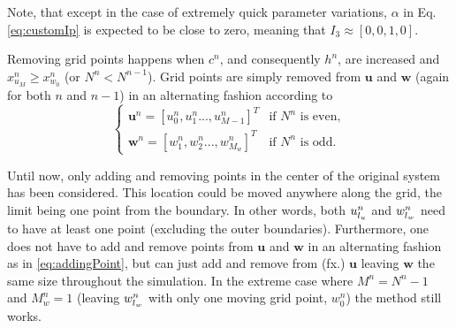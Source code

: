 \noindent Note, that except in the case of extremely quick parameter variations, $\alpha$ in Eq. \eqref{eq:customIp} is expected to be close to zero, %
meaning that $I_3 \approx [0, 0, 1, 0]$. %

Removing grid points happens when $c^n$, and consequently $h^n$, are increased and $x_{u_M}^n \geq x_{w_0}^n$ (or $ N^n <  N^{n-1}$). %
Grid points are simply removed from $\mathbf{u}$ and $\mathbf{w}$ (again for both $n$ and $n-1$) in an alternating fashion according to
\begin{equation}\label{eq:removingPoint}
\begin{cases}
    \mathbf{u}^n = [u_0^n, u_1^n ..., u_{M-1}^n]^T & \text{if $N^n$ is even}, \\
     \mathbf{w}^n = [w_1^n, w_2^n ..., w_{M_w}^n]^T & \text{if $N^n$ is odd}.
    \end{cases}
\end{equation}

Until now, only adding and removing points in the center of the original system has been considered. This location could be moved anywhere along the grid, the limit being one point from the boundary. In other words, both $u_{l_u}^n$ and $w_{l_w}^n$ need to have at least one point (excluding the outer boundaries). Furthermore, one does not have to add and remove points from $\mathbf{u}$ and $\mathbf{w}$ in an alternating fashion as in \eqref{eq:addingPoint}, but can just add and remove from (fx.) $\mathbf{u}$ leaving $\mathbf{w}$ the same size throughout the simulation. In the extreme case where $M^n = N^n - 1$ and $M_w^n = 1$ (leaving $w_{l_w}^n$ with only one moving grid point, $w_0^n$) the method still works.

